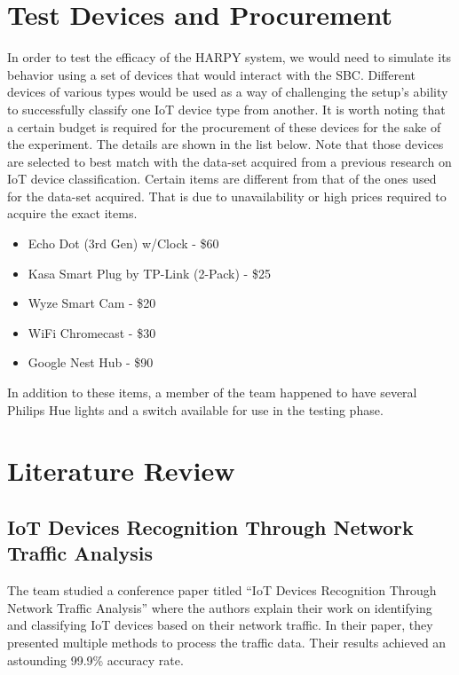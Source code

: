 \documentclass{article}
\begin{document}
\section{Test Devices and Procurement}
In order to test the efficacy of the HARPY system, we would need to simulate its behavior using a set of devices that would interact with the SBC. Different devices of various types would be used as a way of challenging the setup’s ability to successfully classify one IoT device type from another. It is worth noting that a certain budget is required for the procurement of these devices for the sake of the experiment. The details are shown in the list below. Note that those devices are selected to best match with the data-set acquired from a previous research on IoT device classification. Certain items are different from that of the ones used for the data-set acquired. That is due to unavailability or high prices required to acquire the exact items.\newline
\begin{itemize}
	\item Echo Dot (3rd Gen) w/Clock - \$60
	\item Kasa Smart Plug by TP-Link (2-Pack) - \$25
	\item Wyze Smart Cam - \$20
	\item WiFi Chromecast - \$30
	\item Google Nest Hub - \$90
\end{itemize}
In addition to these items, a member of the team happened to have several Philips Hue lights and a switch available for use in the testing phase.

\pagebreak

\section{Literature Review}
\subsection{IoT Devices Recognition Through Network Traffic Analysis}
The team studied a conference paper titled “IoT Devices Recognition Through Network Traffic Analysis” \cite{IoTDevicesRecognitionThroughNetworkTrafficAnalysis} where the authors explain their work on identifying and classifying IoT devices based on their network traffic. In their paper, they presented multiple methods to process the traffic data. Their results achieved an astounding 99.9\% accuracy rate. 
\newline
\end{document}
